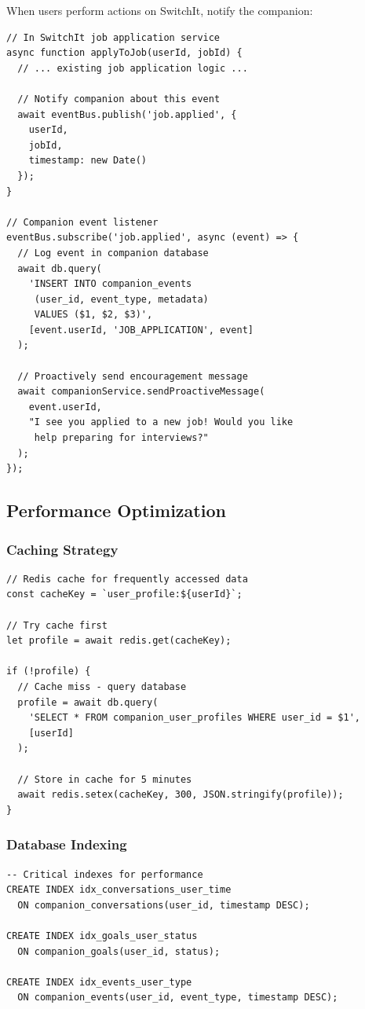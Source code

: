 \documentclass[12pt,a4paper]{article}
\begin{document}
When users perform actions on SwitchIt, notify the companion:

\begin{verbatim}
// In SwitchIt job application service
async function applyToJob(userId, jobId) {
  // ... existing job application logic ...
  
  // Notify companion about this event
  await eventBus.publish('job.applied', {
    userId,
    jobId,
    timestamp: new Date()
  });
}

// Companion event listener
eventBus.subscribe('job.applied', async (event) => {
  // Log event in companion database
  await db.query(
    'INSERT INTO companion_events 
     (user_id, event_type, metadata) 
     VALUES ($1, $2, $3)',
    [event.userId, 'JOB_APPLICATION', event]
  );
  
  // Proactively send encouragement message
  await companionService.sendProactiveMessage(
    event.userId,
    "I see you applied to a new job! Would you like 
     help preparing for interviews?"
  );
});
\end{verbatim}

\subsection{Performance Optimization}

\subsubsection{Caching Strategy}

\begin{verbatim}
// Redis cache for frequently accessed data
const cacheKey = `user_profile:${userId}`;

// Try cache first
let profile = await redis.get(cacheKey);

if (!profile) {
  // Cache miss - query database
  profile = await db.query(
    'SELECT * FROM companion_user_profiles WHERE user_id = $1',
    [userId]
  );
  
  // Store in cache for 5 minutes
  await redis.setex(cacheKey, 300, JSON.stringify(profile));
}
\end{verbatim}

\subsubsection{Database Indexing}

\begin{verbatim}
-- Critical indexes for performance
CREATE INDEX idx_conversations_user_time 
  ON companion_conversations(user_id, timestamp DESC);

CREATE INDEX idx_goals_user_status 
  ON companion_goals(user_id, status);

CREATE INDEX idx_events_user_type 
  ON companion_events(user_id, event_type, timestamp DESC);
\end{verbatim}
\end{document}

